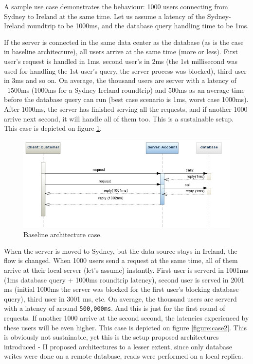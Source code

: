 \documentclass{uvamscse}
\begin{document}
A sample use case demonstrates the behaviour: 1000 users connecting from Sydney to Ireland at the same time. Let us assume a latency of the Sydney-Ireland roundtrip to be 1000ms, and the database query handling time to be 1ms.

If the server is connected in the same data center as the database (as is the case in baseline architecture), all users arrive at the same time (more or less). First user's request is handled in 1ms, second user's in 2ms (the 1st millisecond was used for handling the 1st user's query, the server process was blocked), third user in 3ms and so on. On average, the thousand users are server with a latency of ~1500ms (1000ms for a Sydney-Ireland roundtrip) and 500ms as an average time before the database query can run (best case scenario is 1ms, worst case 1000ms). After 1000ms, the server has finished serving all the requests, and if another 1000 arrive next second, it will handle all of them too. This is a sustainable setup. This case is depicted on figure \ref{figure:case1}.

\begin{figure}[H]
\centering
\includegraphics[scale=0.5]{case1}
\caption{Baseline architecture case.}
\label{figure:case1}
\end{figure}

When the server is moved to Sydney, but the data source stays in Ireland, the flow is changed. When 1000 users send a request at the same time, all of them arrive at their local server (let's assume) instantly. First user is serverd in 1001ms (1ms database query + 1000ms roundtrip latency), second user is served in 2001 ms (initial 1000ms the server was blocked for the first user's blocking database query), third user in 3001 ms, etc. On average, the thousand users are serverd with a latency of around \texttt{500,000ms}. And this is just for the first round of requests. If another 1000 arrive at the second second, the latencies experienced by these users will be even higher. This case is depicted on figure \ref{figure:case2}. This is obviously not sustainable, yet this is the setup proposed architectures introduced - II proposed architectures to a lesser extent, since only database writes were done on a remote database, reads were performed on a local replica.
\end{document}
